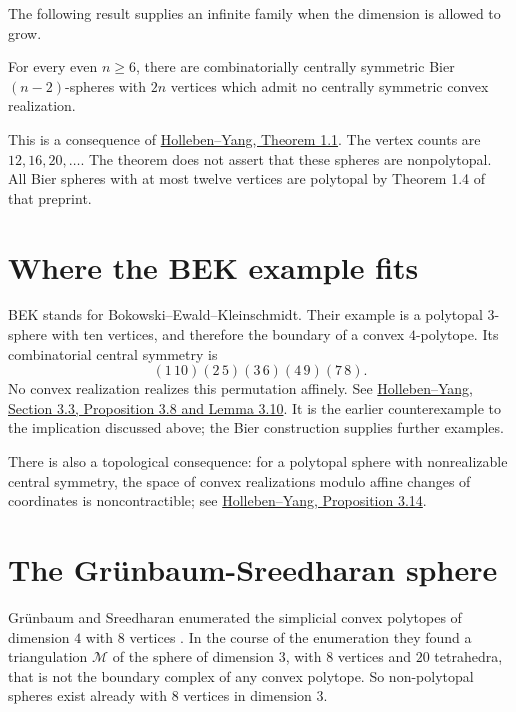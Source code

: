 The following result supplies an infinite
family when the dimension is allowed to
grow.

\begin{theorem}
\label{theorem-bier-infinite-family}
For every even $n\geq6$, there are
combinatorially centrally symmetric Bier
$(n-2)$-spheres with $2n$ vertices which
admit no centrally symmetric convex
realization.
\end{theorem}

\noindent
This is a consequence of
\href{https://arxiv.org/abs/2608.07233}
{Holleben--Yang, Theorem 1.1}.
The vertex counts are $12,16,20,\ldots$.
The theorem does not assert that these
spheres are nonpolytopal. All Bier spheres
with at most twelve vertices are
polytopal by Theorem 1.4 of that preprint.

\section{Where the BEK example fits}
\label{subsection-bek-example}

\noindent
BEK stands for
Bokowski--Ewald--Kleinschmidt.
Their example is a polytopal $3$-sphere
with ten vertices, and therefore the
boundary of a convex $4$-polytope.
Its combinatorial central symmetry is
$$
(1\,10)(2\,5)(3\,6)(4\,9)(7\,8).
$$
No convex realization realizes this
permutation affinely. See
\href{https://arxiv.org/abs/2608.07233}
{Holleben--Yang, Section 3.3, Proposition 3.8
and Lemma 3.10}.
It is the earlier counterexample to the
implication discussed above; the Bier
construction supplies further examples.

There is also a topological consequence:
for a polytopal sphere with nonrealizable
central symmetry, the space of convex
realizations modulo affine changes of
coordinates is noncontractible;
see \href{https://arxiv.org/abs/2608.07233}
{Holleben--Yang, Proposition 3.14}.

\section{The Grünbaum-Sreedharan sphere}
\label{section-grunbaum-sreedharan-sphere}

\noindent
Grünbaum and Sreedharan enumerated the
simplicial convex polytopes of dimension $4$
with $8$ vertices \cite{gru}. In the course
of the enumeration they found a triangulation
$\mathcal{M}$ of the sphere of dimension $3$,
with $8$ vertices and $20$ tetrahedra, that
is not the boundary complex of any convex
polytope. So non-polytopal spheres exist
already with $8$ vertices in dimension $3$.

